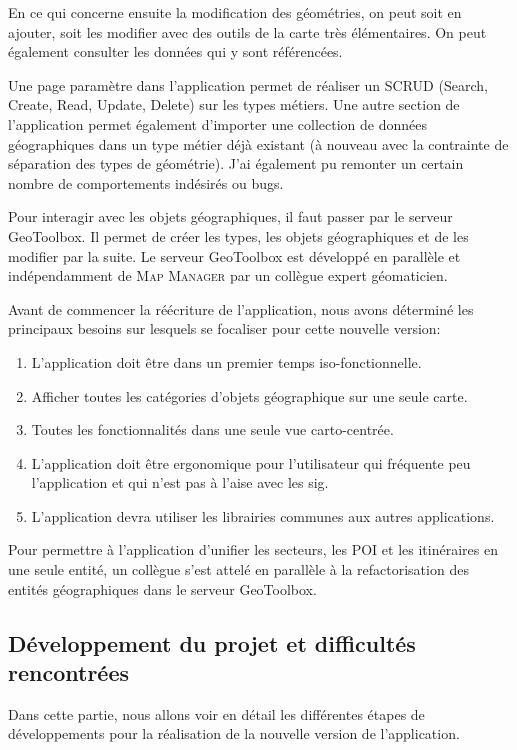 \documentclass{rapportUHA40}
\begin{document}
En ce qui concerne ensuite la modification des géométries, on peut soit en
ajouter, soit les modifier avec des outils de la carte très élémentaires. On
peut également consulter les données qui y sont référencées.

Une page paramètre dans l'application permet de réaliser un SCRUD (Search,
Create, Read, Update, Delete) sur les types métiers. Une autre section de
l'application permet également d'importer une collection de données
géographiques dans un type métier déjà existant (à nouveau avec la contrainte
de séparation des types de géométrie). J'ai également pu remonter un certain
nombre de comportements indésirés ou bugs.

Pour interagir avec les objets géographiques, il faut passer par le serveur
GeoToolbox. Il permet de créer les types, les objets géographiques et de les
modifier par la suite. Le serveur GeoToolbox est développé en parallèle et
indépendamment de \textsc{Map Manager} par un collègue expert géomaticien.

Avant de commencer la réécriture de l'application, nous avons déterminé les
principaux besoins sur lesquels se focaliser pour cette nouvelle version:
\begin{enumerate}
  \item L'application doit être dans un premier temps iso-fonctionnelle.
  \item Afficher toutes les catégories d'objets géographique sur une seule carte.
  \item Toutes les fonctionnalités dans une seule vue carto-centrée.
  \item L'application doit être ergonomique pour l'utilisateur qui fréquente peu
        l'application et qui n'est pas à l'aise avec les \gls{sig}.
  \item L'application devra utiliser les librairies communes aux autres applications.
\end{enumerate}

Pour permettre à l'application d'unifier les secteurs, les POI et les
itinéraires en une seule entité, un collègue s'est attelé en parallèle à la
refactorisation des entités géographiques dans le serveur GeoToolbox.

\subsection{Développement du projet et difficultés rencontrées}
Dans cette partie, nous allons voir en détail les différentes étapes de
développements pour la réalisation de la nouvelle version de l'application.
\end{document}
